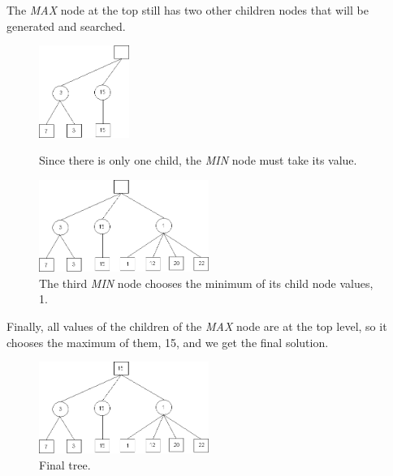 The \textit{MAX} node at the top still has two other children nodes that will be generated and searched.

\begin{figure}[H]
\centering
	\begin{minipage}[b]{0.45\linewidth}
		\centering
		\includegraphics[height=3cm]{2_State_of_the_art/Arimaa_on_MCTS_Benoit/img/Minimax6.png}
		\caption{\label{fig:Minimax6}Since there is only one child, the \textit{MIN} node must take its value.}
		\end{minipage}%
	\hspace*{1cm}
	\begin{minipage}[b]{0.45\linewidth}
		\centering
		\includegraphics[height=3cm]{2_State_of_the_art/Arimaa_on_MCTS_Benoit/img/Minimax8.png}
		\caption{\label{fig:Minimax8}The third \textit{MIN} node chooses the minimum of its child node values, 1.}
	\end{minipage}%
\end{figure}

Finally, all values of the children of the \textit{MAX} node are at the top level, so it chooses the maximum of them, 15, and we get the final solution. 

\begin{figure}[H]
\centering
	\begin{minipage}[b]{1\linewidth}
		\centering
		\includegraphics[height=3cm]{2_State_of_the_art/Arimaa_on_MCTS_Benoit/img/Minimax9.png}
		\caption{\label{fig:Minimax9}Final tree.}
	\end{minipage}%
\end{figure}

